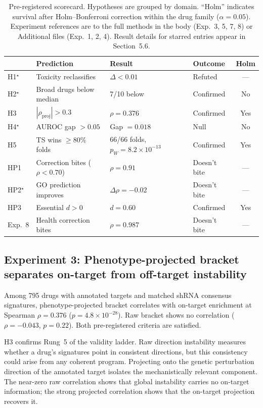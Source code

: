\documentclass[11pt]{article}
\begin{document}
\begin{table}[t]
\centering
\caption{Pre-registered scorecard. Hypotheses are grouped by domain.
``Holm'' indicates survival after Holm--Bonferroni correction within
the drug family ($\alpha = 0.05$). Experiment references are to the
full methods in the body (Exp.~3, 5, 7, 8) or Additional files
(Exp.~1, 2, 4). Result details for starred entries appear in Section~5.6.}
\label{tab:scorecard}
\small
\begin{tabular}{llllc}
\toprule
 & Prediction & Result & Outcome & Holm \\
\midrule
H1$^\star$ & Toxicity reclassifies & $\Delta < 0.01$ & Refuted & --- \\
H2$^\star$ & Broad drugs below median & 7/10 below & Confirmed & No \\
H3 & $|\rho_{\text{proj}}| > 0.3$ & $\rho = 0.376$ & Confirmed & Yes \\
H4$^\star$ & AUROC gap $> 0.05$ & Gap $= 0.018$ & Null & No \\
H5 & TS wins $\geq$80\% folds & 66/66 folds, $p_W = 8.2 \times 10^{-13}$ & Confirmed & Yes \\
\midrule
HP1 & Correction bites ($\rho < 0.70$) & $\rho = 0.91$ & Doesn't bite & --- \\
HP2$^\star$ & GO prediction improves & $\Delta\rho = -0.02$ & Doesn't bite & --- \\
HP3 & Essential $d > 0$ & $d = 0.60$ & Confirmed & Yes \\
\midrule
Exp.~8 & Health correction bites & $\rho = 0.987$ & Doesn't bite & --- \\
\bottomrule
\end{tabular}
\end{table}

\subsection{Experiment 3: Phenotype-projected bracket separates on-target from off-target instability}

Among 795 drugs with annotated targets and matched shRNA consensus signatures,
phenotype-projected bracket correlates with on-target enrichment at Spearman
$\rho = 0.376$ ($p = 4.8 \times 10^{-28}$). Raw bracket shows no correlation
($\rho = -0.043$, $p = 0.22$). Both pre-registered criteria are satisfied.

H3 confirms Rung~5 of the validity ladder. Raw direction instability
measures whether a drug's signatures point in consistent directions, but
this consistency could arise from any coherent program. Projecting onto the
genetic perturbation direction of the annotated target isolates the
mechanistically relevant component. The near-zero raw correlation shows
that global instability carries no on-target information; the strong
projected correlation shows that the on-target projection recovers it.
\end{document}
